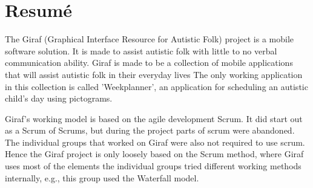 \chapter*{Resumé}
The Giraf (Graphical Interface Resource for Autistic Folk) project is a mobile software solution.
It is made to assist autistic folk with little to no verbal communication ability.
Giraf is made to be a collection of mobile applications that will assist autistic folk in their everyday lives
The only working application in this collection is called 'Weekplanner', an application for scheduling an autistic child's day using pictograms.

Giraf's working model is based on the agile development Scrum.
It did start out as a Scrum of Scrums, but during the project parts of scrum were abandoned.
The individual groups that worked on Giraf were also not required to use scrum.
Hence the Giraf project is only loosely based on the Scrum method, where Giraf uses most of the elements the individual groups tried different working methods internally, e.g., this group used the Waterfall model.





\newpage
